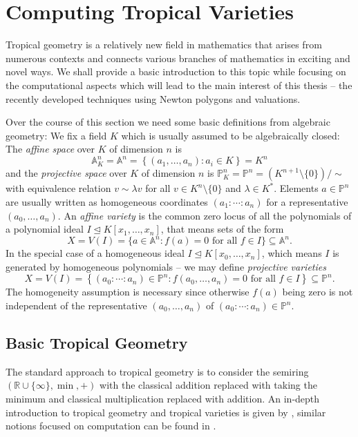 \documentclass[
  paper=a4,
  titlepage,
  bibliography=totoc,
  pagesize=pdftex
]{scrartcl}
\numberwithin{figure}{section}
\numberwithin{equation}{section}
\numberwithin{table}{section}
\newcommand*\setR{\mathds{R}}
\newcommand*\setA{\mathds{A}}
\newcommand*\setP{\mathds{P}}
\let\idealof\trianglelefteq
\theoremstyle{definition}
\numberwithin{definition}{section}
\begin{document}
\section{Computing Tropical Varieties}

Tropical geometry is a relatively new field in mathematics that arises from numerous
contexts and connects various branches of mathematics in exciting and novel ways. We shall
provide a basic introduction to this topic while focusing on the computational aspects
which will lead to the main interest of this thesis -- the recently developed techniques
using Newton polygons and valuations.

Over the course of this section we need some basic definitions from algebraic geometry: We
fix a field $K$ which is usually assumed to be algebraically closed: The \emph{affine
space} over $K$ of dimension $n$ is
\[
  \setA_K^n = \setA^n = \left\{ (a_1,\dots,a_n) : a_i \in K\right\} = K^n
\]
and the \emph{projective space} over $K$ of dimension $n$ is $\setP^n_K = \setP^n =
(K^{n+1}\setminus\{0\})/\sim$ with equivalence relation $v \sim \lambda v$ for all $v \in
K^n\setminus \{0\}$ and $\lambda \in K^*$. Elements $a \in \setP^n$ are usually written as
homogeneous coordinates $(a_1:\cdots:a_n)$ for a representative $(a_0, \dots, a_n)$. An
\emph{affine variety} is the common zero locus of all the polynomials of a polynomial
ideal $I \idealof K[x_1, \dots, x_n]$, that means sets of the form
\[
  X = V(I) = \{ a \in \setA^n : f(a) = 0 \text{ for all $f\in I$} \} \subseteq \setA^n.
\]
In the special case of a homogeneous ideal $I \idealof K[x_0,\dots,x_n]$, which means $I$
is generated by homogeneous polynomials -- we may define \emph{projective varieties}
\[
  X = V(I) = \left\{ (a_0:\cdots:a_n) \in \setP^n : f(a_0, \dots, a_n) = 0
    \text{ for all $f \in I$}
  \right\} \subseteq \setP^n.
\]
The homogeneity assumption is necessary since otherwise $f(a)$ being zero is not
independent of the representative $(a_0,\dots,a_n)$ of $(a_0:\cdots:a_n)\in \setP^n$.

\subsection{Basic Tropical Geometry}
\label{sec:tropIntro}

The standard approach to tropical geometry is to consider the semiring $(\setR \cup
\{\infty\}, \min, +)$ with the classical addition replaced with taking the minimum and
classical multiplication replaced with addition. An in-depth introduction to tropical
geometry and tropical varieties is given by \cite{sturmMacTrop}, similar notions focused
on computation can be found in \cite{compTropVar}.
\end{document}
